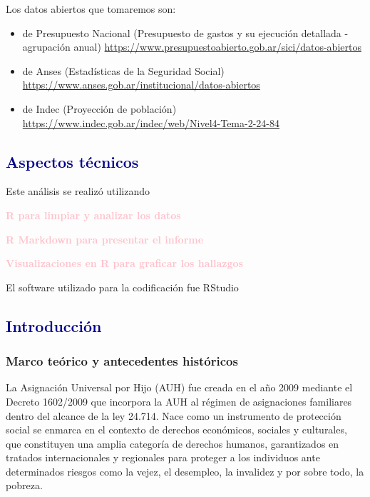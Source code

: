 \documentclass[
  12,
]{article}
\begin{document}
Los datos abiertos que tomaremos son:

\begin{itemize}
\item
  de Presupuesto Nacional (Presupuesto de gastos y su ejecución
  detallada - agrupación anual)
  \url{https://www.presupuestoabierto.gob.ar/sici/datos-abiertos}
\item
  de Anses (Estadísticas de la Seguridad Social)
  \url{https://www.anses.gob.ar/institucional/datos-abiertos}
\item
  de Indec (Proyección de población)
  \url{https://www.indec.gob.ar/indec/web/Nivel4-Tema-2-24-84}
\end{itemize}

\hypertarget{aspectos-tuxe9cnicos}{%
\subsection{\texorpdfstring{\textcolor{darkblue}{Aspectos
técnicos}}{Aspectos técnicos}}\label{aspectos-tuxe9cnicos}}

Este análisis se realizó utilizando

\textcolor{pink}{\textbf{R para limpiar y analizar los datos}}

\textcolor{pink}{\textbf{R Markdown para presentar el informe}}

\textcolor{pink}{\textbf{Visualizaciones en R para graficar los
hallazgos}}

El software utilizado para la codificación fue RStudio

\hypertarget{introducciuxf3n}{%
\subsection{\texorpdfstring{\textcolor{darkblue}{Introducción}}{Introducción}}\label{introducciuxf3n}}

\hypertarget{marco-teuxf3rico-y-antecedentes-histuxf3ricos}{%
\subsubsection{Marco teórico y antecedentes
históricos}\label{marco-teuxf3rico-y-antecedentes-histuxf3ricos}}

La Asignación Universal por Hijo (AUH) fue creada en el año 2009
mediante el Decreto 1602/2009 que incorpora la AUH al régimen de
asignaciones familiares dentro del alcance de la ley 24.714. Nace como
un instrumento de protección social se enmarca en el contexto de
derechos económicos, sociales y culturales, que constituyen una amplia
categoría de derechos humanos, garantizados en tratados internacionales
y regionales para proteger a los individuos ante determinados riesgos
como la vejez, el desempleo, la invalidez y por sobre todo, la pobreza.
\end{document}
